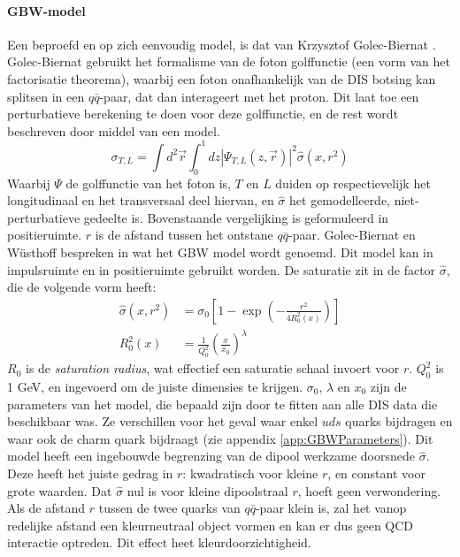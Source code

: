 \documentclass[a4paper,11pt]{article}
\numberwithin{equation}{section} %
\begin{document}
      \paragraph{GBW-model}
Een beproefd en op zich eenvoudig model, is dat van Krzysztof Golec-Biernat \cite{GB}.
Golec-Biernat gebruikt het formalisme van de foton golffunctie (een vorm van het factorisatie theorema), waarbij een foton onafhankelijk van de DIS botsing kan splitsen in een $q\bar{q}$-paar, dat dan interageert met het proton.
Dit laat toe een perturbatieve berekening te doen voor deze golffunctie, en de rest wordt beschreven door middel van een model.
\begin{equation}
\sigma_{T,L} = \int d^2 \vec{r} \int_0^1 dz |\Psi_{T,L} (z, \vec{r})|^2 \hat{\sigma} (x,r^2)
\end{equation}
Waarbij $\Psi$ de golffunctie van het foton is, $T$ en $L$ duiden op respectievelijk het longitudinaal en het transversaal deel hiervan, en $\hat{\sigma}$ het gemodelleerde, niet-perturbatieve gedeelte is.
Bovenstaande vergelijking is geformuleerd in positieruimte.
$r$ is de afstand tussen het ontstane $q\bar{q}$-paar.
Golec-Biernat en Wüsthoff bespreken in \cite{GBW} wat het GBW model wordt genoemd.
Dit model kan in impulsruimte en in positieruimte gebruikt worden.
De saturatie zit in de factor $\hat{\sigma}$, die de volgende vorm heeft:
\begin{align}
\hat{\sigma}(x,r^2) &= \sigma_0 \left[ 1- \exp{\left(-\frac{r^2}{4 R_0^2(x)}\right)} \right] \\
R_0^2(x) &= \frac{1}{Q_0^2} \left( \frac{x}{x_0} \right)^\lambda \label{eq:R0}
\end{align}
$R_0$ is de \textit{saturation radius}, wat effectief een saturatie schaal invoert voor $r$.
$Q_0^2$ is 1 GeV, en ingevoerd om de juiste dimensies te krijgen.
$\sigma_0$, $\lambda$ en $x_0$ zijn de parameters van het model, die bepaald zijn door te fitten aan alle DIS data die beschikbaar was.
Ze verschillen voor het geval waar enkel $uds$ quarks bijdragen en waar ook de charm quark bijdraagt (zie appendix \ref{app:GBWParameters}).
Dit model heeft een ingebouwde begrenzing van de dipool werkzame doorsnede $\hat{\sigma}$.
Deze heeft het juiste gedrag in $r$: kwadratisch voor kleine $r$, en constant voor grote waarden.
Dat $\hat{\sigma}$ nul is voor kleine dipoolstraal $r$, hoeft geen verwondering.
Als de afstand $r$ tussen de twee quarks van $q\bar{q}$-paar klein is, zal het vanop redelijke afstand een kleurneutraal object vormen en kan er dus geen QCD interactie optreden.
Dit effect heet kleurdoorzichtigheid.
\end{document}
